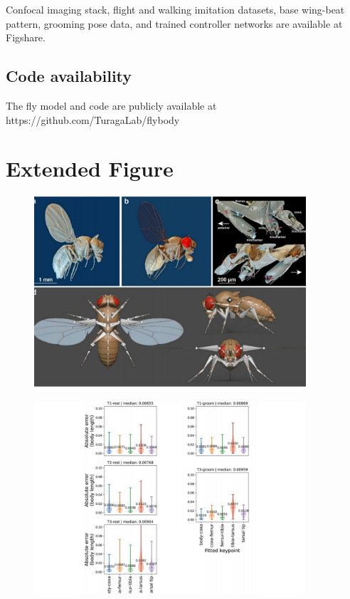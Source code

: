 \documentclass[sn-mathphys-num]{sn-jnl}%
\theoremstyle{thmstyleone}	%
\theoremstyle{thmstyletwo}	%
\theoremstyle{thmstylethree}	%
\begin{document}
Confocal imaging stack, flight and walking imitation datasets, base wing-beat pattern, grooming pose data, and trained controller networks are available at Figshare\cite{vaxenburg2025whole}.


\subsection{Code availability} \label{sec:code_availability}

The fly model and code are publicly available at https://github.com/TuragaLab/flybody


\section{Extended Figure}

\begin{figure}[!htb] 
	\centering
	\includegraphics[width=0.9\textwidth]{fig/extended_fig_1.pdf}
	\caption{
	} \label{fig:extended_fig_1}
\end{figure}


\begin{figure}[!htb] 
	\centering
	\includegraphics[width=0.9\textwidth]{fig/extended_fig_2.pdf}
	\caption{
	} \label{fig:extended_fig_2}
\end{figure}
\end{document}
